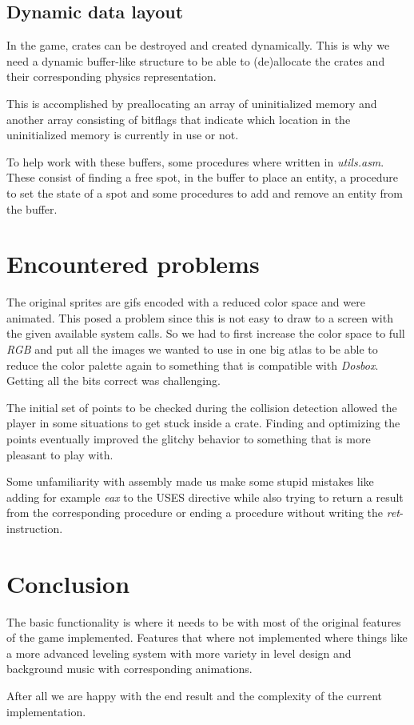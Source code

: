 \documentclass[]{article}
\begin{document}
\subsection{Dynamic data layout}%
\label{sub:dynamic_data_layout}

In the game, crates can be destroyed and created dynamically. This is why we 
need a dynamic buffer-like structure to be able to (de)allocate the crates and
their corresponding physics representation.

This is accomplished by preallocating an array of uninitialized memory and 
another array consisting of bitflags that indicate which location in the 
uninitialized memory is currently in use or not.

To help work with these buffers, some procedures where written in
\emph{utils.asm}. These consist of finding a free spot, in the buffer to place
an entity, a procedure to set the state of a spot and some procedures to add
and remove an entity from the buffer.

\section{Encountered problems}

The original sprites are gifs encoded with a reduced color space and were
animated. This posed a problem since this is not easy to draw to a screen with 
the given available system calls. So we had to first increase the color space 
to full \emph{RGB} and put all the images we wanted to use in one big atlas to
be able to reduce the color palette again to something that is compatible with
\emph{Dosbox}. Getting all the bits correct was challenging.

The initial set of points to be checked during the collision detection allowed
the player in some situations to get stuck inside a crate. Finding and 
optimizing the points eventually improved the glitchy behavior to something 
that is more pleasant to play with.

Some unfamiliarity with assembly made us make some stupid mistakes like adding
for example \emph{eax} to the USES directive while also trying to return a
result from the corresponding procedure or ending a procedure without writing
the \emph{ret}-instruction.

\section{Conclusion}

The basic functionality is where it needs to be with most of the original
features of the game implemented. Features that where not implemented where
things like a more advanced leveling system with more variety in level design
and background music with corresponding animations.

After all we are happy with the end result and the complexity of the current 
implementation.
\end{document}
